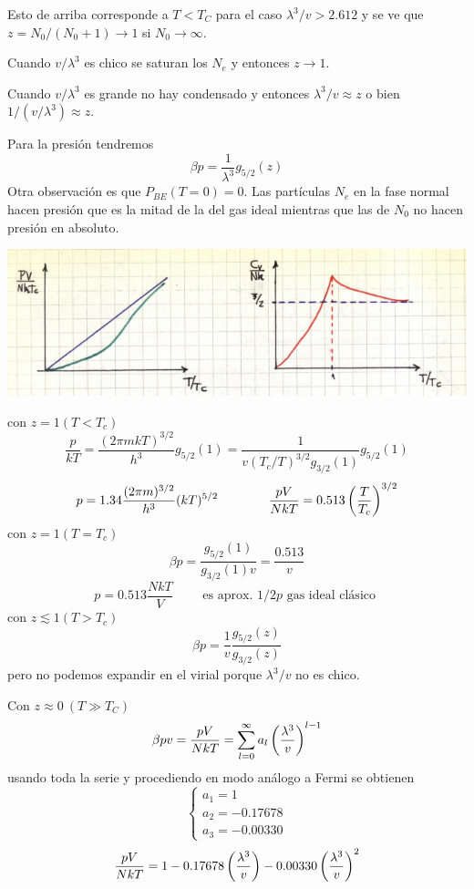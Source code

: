 \documentclass[10pt,oneside]{CBFT_book}
\begin{document}
Esto de arriba corresponde a $T < T_C $ para el caso $\lambda^3/v > 2.612 $ y se ve que 
$z = N_0/(N_0+1) \to 1$ si $N_0\to\infty$.

Cuando $v/\lambda^3$ es chico se saturan los $N_e$ y entonces $ z \to 1 $.

Cuando $v/\lambda^3$ es grande no hay condensado y entonces $ \lambda^3/v \approx z $ o bien
$ 1/ (v/\lambda^3) \approx z $.

Para la presión tendremos
\[
	\beta p = \frac{1}{\lambda^3} g_{5/2}(z)
\]
Otra observación es que $P_{BE}(T=0)=0$. Las partículas $N_e$ en la fase normal hacen presión que es la
mitad de la del gas ideal mientras que las de $N_0$ no hacen presión en absoluto.

\includegraphics[scale=0.4]{images/1606329638.jpg}

con $ z = 1 ( T < T_c ) $
\[
	\frac{p}{kT} = \frac{(2\pi m k T)^{3/2}}{h^3} g_{5/2}(1) = 
	\frac{1}{ v (T_c/T)^{3/2} g_{3/2}(1) } g_{5/2}(1)
\]
\[
	p = 1.34 \frac{(2\pi m )^{3/2}}{h^3} (kT)^{5/2} \qquad \qquad 
	\frac{pV}{NkT} = 0.513 \left( \frac{ T }{ T_c } \right)^{3/2}
\]
con $ z = 1 ( T = T_c ) $
\[
	\beta p = \frac{ g_{5/2}(1) }{ g_{3/2}(1) v } = \frac{0.513}{v}
\]
\[
	p = 0.513 \frac{NkT}{V} \qquad \text{ es aprox. $1/2 p$ gas ideal clásico }
\]
con $ z \lesssim 1 ( T > T_c ) $
\[
	\beta p = \frac{1}{v} \frac{ g_{5/2}(z) }{ g_{3/2}(z) }
\]
pero no podemos expandir en el virial porque $ \lambda^3 / v $ no es chico.

Con $ z \approx 0 \: ( T \gg T_C ) $
\[
	\beta p v = \frac{pV}{NkT} = \sum_{l=0}^\infty a_l \left( \frac{ \lambda^3 }{ v } \right)^{l-1}
\]
usando toda la serie y procediendo en modo análogo a Fermi se obtienen
\[
	\begin{cases}
	 a_1 = 1 \\
	 a_2 = -0.17678 \\
	 a_3 = -0.00330
	\end{cases}
\]
\[
	\frac{pV}{NkT} = 1 - 0.17678 \left( \frac{ \lambda^3 }{ v } \right) - 0.00330 \left( \frac{ \lambda^3 }{ v } \right)^2
\]
\end{document}
